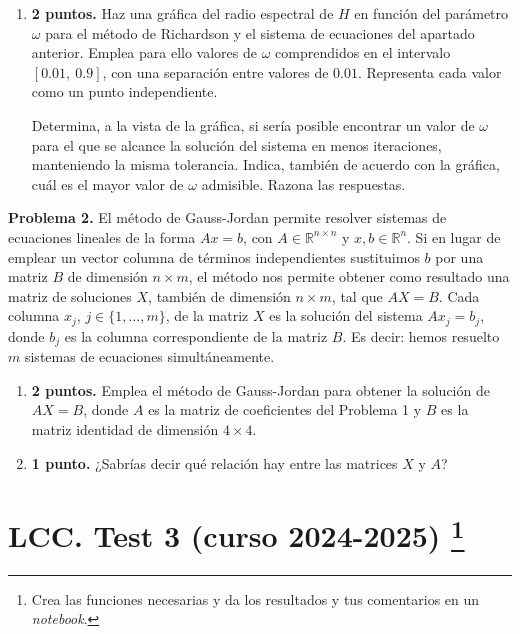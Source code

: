 \begin{enumerate}
Clasifica los tres métodos de mejor a peor, tomando como criterio el número de iteraciones empleado por cada uno de ellos para alcanzar la solución.

\item \textbf{2 puntos.} Haz una gráfica del radio espectral de $H$ en función del parámetro $\omega$ para el método de Richardson y el sistema de ecuaciones del apartado anterior. Emplea para ello valores de $\omega$ comprendidos en el intervalo $[0.01,\ 0.9]$, con una separación entre valores de $0.01$. Representa cada valor como un punto independiente.

Determina, a la vista de la gráfica, si sería posible encontrar un valor de $\omega$ para el que se alcance la solución del sistema en menos iteraciones, manteniendo la misma tolerancia. Indica, también de acuerdo con la gráfica, cuál es el mayor valor de $\omega$ admisible. Razona las respuestas.
\end{enumerate}

\noindent \textbf{Problema 2.} El método de Gauss-Jordan permite resolver sistemas de ecuaciones lineales de la forma $Ax =b$, con $A \in \mathbb{R}^{n\times n}$ y $x,b  \in \mathbb{R}^{n}$. Si en lugar de emplear un vector columna de términos independientes sustituimos $b$ por una matriz $B$ de dimensión $n\times m$, el método nos permite obtener como resultado una matriz de soluciones $X$, también de dimensión $n\times m$, tal que $AX=B$. Cada columna $x_j$, $j\in\{1,\dots,m\}$, de la matriz $X$ es la solución del sistema $Ax_j=b_j$, donde $b_j$ es la columna correspondiente de la matriz $B$. Es decir: hemos resuelto $m$ sistemas de ecuaciones simultáneamente.

\begin{enumerate}
\item \textbf{2 puntos.} Emplea el método de Gauss-Jordan para obtener la solución de $AX=B$, donde $A$ es la matriz de coeficientes del Problema 1 y $B$ es la matriz identidad de dimensión $4\times4$.
\item \textbf{1 punto.} ¿Sabrías decir qué relación hay entre las matrices $X$ y $A$?
\end{enumerate}

\section{LCC. Test 3 (curso 2024-2025) \protect\footnote{Crea las funciones necesarias y da los resultados y tus comentarios en un \emph{notebook}.}}

